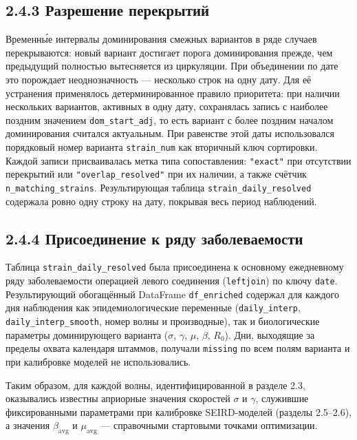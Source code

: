\documentclass[12pt]{article}
\begin{document}
\subsection{2.4.3 Разрешение
перекрытий}\label{ux440ux430ux437ux440ux435ux448ux435ux43dux438ux435-ux43fux435ux440ux435ux43aux440ux44bux442ux438ux439}

Временны́е интервалы доминирования смежных вариантов в ряде случаев
перекрываются: новый вариант достигает порога доминирования прежде, чем
предыдущий полностью вытесняется из циркуляции. При объединении по дате
это порождает неоднозначность --- несколько строк на одну дату. Для её
устранения применялось детерминированное правило приоритета: при наличии
нескольких вариантов, активных в одну дату, сохранялась запись с
наиболее поздним значением \texttt{dom\_start\_adj}, то есть вариант с
более поздним началом доминирования считался актуальным. При равенстве
этой даты использовался порядковый номер варианта \texttt{strain\_num}
как вторичный ключ сортировки. Каждой записи присваивалась метка типа
сопоставления: \texttt{"exact"} при отсутствии перекрытий или
\texttt{"overlap\_resolved"} при их наличии, а также счётчик
\texttt{n\_matching\_strains}. Результирующая таблица
\texttt{strain\_daily\_resolved} содержала ровно одну строку на дату,
покрывая весь период наблюдений.

\subsection{2.4.4 Присоединение к ряду
заболеваемости}\label{ux43fux440ux438ux441ux43eux435ux434ux438ux43dux435ux43dux438ux435-ux43a-ux440ux44fux434ux443-ux437ux430ux431ux43eux43bux435ux432ux430ux435ux43cux43eux441ux442ux438}

Таблица \texttt{strain\_daily\_resolved} была присоединена к основному
ежедневному ряду заболеваемости операцией левого соединения
(\texttt{leftjoin}) по ключу \texttt{date}. Результирующий обогащённый
DataFrame \texttt{df\_enriched} содержал для каждого дня наблюдения как
эпидемиологические переменные (\texttt{daily\_interp},
\texttt{daily\_interp\_smooth}, номер волны и производные), так и
биологические параметры доминирующего варианта (\(\sigma\), \(\gamma\),
\(\mu\), \(\beta\), \(R_0\)). Дни, выходящие за пределы охвата календаря
штаммов, получали \texttt{missing} по всем полям варианта и при
калибровке моделей не использовались.

Таким образом, для каждой волны, идентифицированной в разделе 2.3,
оказывались известны априорные значения скоростей \(\sigma\) и
\(\gamma\), служившие фиксированными параметрами при калибровке
SEIRD-моделей (разделы 2.5--2.6), а значения \(\beta_{\text{avg}}\) и
\(\mu_{\text{avg}}\) --- справочными стартовыми точками оптимизации.
\end{document}
